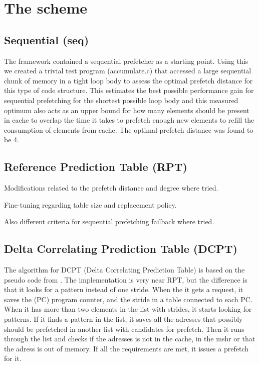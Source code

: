 \chapter{The scheme}

\section{Sequential (seq)}
The framework contained a sequential prefetcher as a starting point.
Using this we created a trivial test program (accumulate.c) that accessed
a large sequential chunk of memory in a tight loop body to assess the
optimal prefetch distance for this type of code structure.
This estimates the best possible performance gain for sequential
prefetching for the shortest possible loop body and this
measured optimum also acts as an upper bound for how many elements should
be present in cache to overlap the time it takes to prefetch enough new
elements to refill the consumption of elements from cache. The optimal
prefetch distance was found to be 4. %

\section{Reference Prediction Table (RPT)}
Modifications related to the prefetch distance and degree where tried.

Fine-tuning regarding table size and replacement policy.

Also different criteria for sequential prefetching failback where tried.


\section{Delta Correlating Prediction Table (DCPT)}
The algorithm for DCPT (Delta Correlating Prediction Table) is based on the pseudo code from \cite{dcptpaper}.
The implementation is very near RPT, but the difference is that it looks for a pattern instead of one stride.
When the it gets a request, it saves the (PC) program counter, and the stride in a table connected to each PC. When it has more than two elements in the list with strides, it starts looking for patterns.
If it finds a pattern in the list, it saves all the adresses that possibly should be prefetched in another list with candidates for prefetch.
Then it runs through the list and checks if the adresses is not in the cache, in the mshr or that the adress is out of memory. If all the requirements are met, it issues a prefetch for it.

